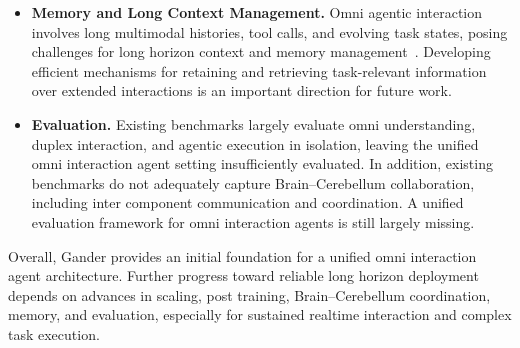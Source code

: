\begin{itemize}
\item \textbf{Memory and Long Context Management.} Omni agentic interaction involves long multimodal histories, tool calls, and evolving task states, posing challenges for long horizon context and memory management~\cite{xie2026voicemem}. Developing efficient mechanisms for retaining and retrieving task-relevant information over extended interactions is an important direction for future work.

\item \textbf{Evaluation.} Existing benchmarks largely evaluate omni understanding, duplex interaction, and agentic execution in isolation, leaving the unified omni interaction agent setting insufficiently evaluated. In addition, existing benchmarks do not adequately capture Brain–Cerebellum collaboration, including inter component communication and coordination. A unified evaluation framework for omni interaction agents is still largely missing.


\end{itemize}

Overall, Gander provides an initial foundation for a unified omni interaction agent architecture. Further progress toward reliable long horizon deployment depends on advances in scaling, post training, Brain–Cerebellum coordination, memory, and evaluation, especially for sustained realtime interaction and complex task execution.